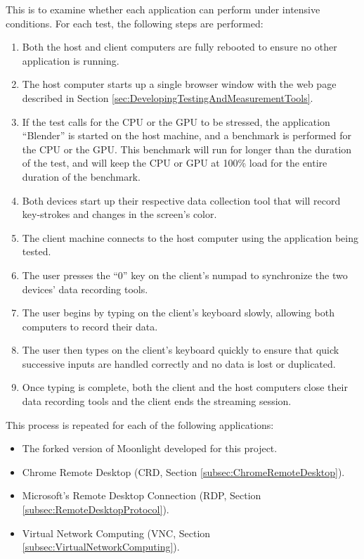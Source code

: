 \noindent
This is to examine whether each application can perform under intensive conditions.
For each test, the following steps are performed:

\begin{enumerate}
  \item Both the host and client computers are fully rebooted to ensure no other application is running.
  \item The host computer starts up a single browser window with the web page described in Section \ref{sec:DevelopingTestingAndMeasurementTools}.
  \item If the test calls for the CPU or the GPU to be stressed, the application \enquote{Blender} is started on the host machine, and a benchmark is performed for the CPU or the GPU.
        This benchmark will run for longer than the duration of the test, and will keep the CPU or GPU at 100\% load for the entire duration of the benchmark.
  \item Both devices start up their respective data collection tool that will record key-strokes and changes in the screen's color.
  \item The client machine connects to the host computer using the application being tested.
  \item The user presses the \enquote{0} key on the client's numpad to synchronize the two devices' data recording tools.
  \item The user begins by typing on the client's keyboard slowly, allowing both computers to record their data.
  \item The user then types on the client's keyboard quickly to ensure that quick successive inputs are handled correctly and no data is lost or duplicated.
  \item Once typing is complete, both the client and the host computers close their data recording tools and the client ends the streaming session.
\end{enumerate}

\noindent
This process is repeated for each of the following applications:

\begin{itemize}
  \item The forked version of Moonlight developed for this project.
  \item Chrome Remote Desktop (CRD, Section \ref{subsec:ChromeRemoteDesktop}).
  \item Microsoft's Remote Desktop Connection (RDP, Section \ref{subsec:RemoteDesktopProtocol}).
  \item Virtual Network Computing (VNC, Section \ref{subsec:VirtualNetworkComputing}).
\end{itemize}

